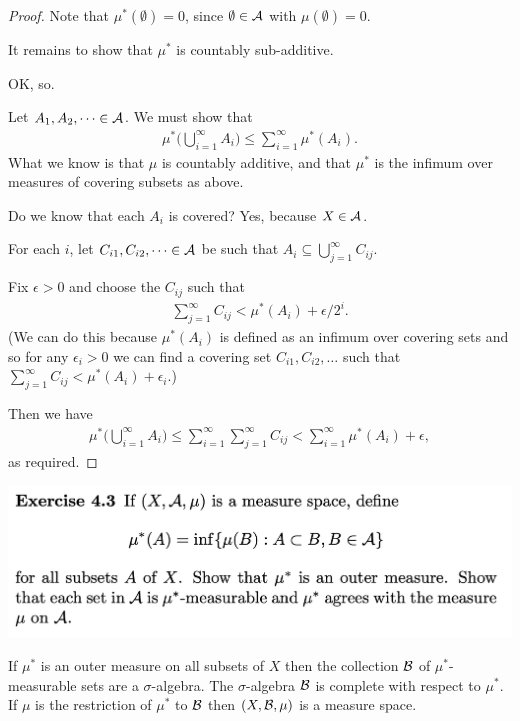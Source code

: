 \begin{proof}
  Note that $\mu^*(\emptyset) = 0$, since $\emptyset \in \mathcal A$ with $\mu(\emptyset) = 0$.

  It remains to show that $\mu^*$ is countably sub-additive.

  OK, so.

  Let $A_1, A_2, \dots \in \mathcal A$. We must show that
  \begin{align*}
    \mu^*\Big(\bigcup_{i=1}^\infty A_i\Big) \leq \sum_{i=1}^\infty \mu^*(A_i).
  \end{align*}
  What we know is that $\mu$ is countably additive, and that $\mu^*$ is the infimum over measures of covering
  subsets as above.

  Do we know that each $A_i$ is covered? Yes, because $X \in \mathcal A$.

  For each $i$, let $C_{i1}, C_{i2}, \dots \in \mathcal A$ be such that $A_i \subseteq \bigcup_{j=1}^\infty C_{ij}$.

  Fix $\epsilon > 0$ and choose the $C_{ij}$ such that
  \begin{align*}
    \sum_{j=1}^\infty C_{ij} < \mu^*(A_i) + \epsilon/2^i.
  \end{align*}
  (We can do this because $\mu^*(A_i)$ is defined as an infimum over covering sets and so for
  any $\epsilon_i > 0$ we can find a covering set $C_{i1}, C_{i2}, \dots$ such
  that $\sum_{j=1}^\infty C_{ij} < \mu^*(A_i) + \epsilon_i$.)

  Then we have
  \begin{align*}
    \mu^*\Big(\bigcup_{i=1}^\infty A_i\Big) \leq \sum_{i=1}^\infty \sum_{j=1}^\infty C_{ij} < \sum_{i=1}^\infty \mu^*(A_i) + \epsilon,
  \end{align*}
  as required.
\end{proof}
\includegraphics[width=400pt]{img/analysis--berkeley-202a-hw-0d98.png}

\begin{lemma}\label{carathéodory-theorem}
  If $\mu^*$ is an outer measure on all subsets of $X$ then the collection $\mathcal B$ of $\mu^*$-measurable sets
  are a $\sigma$-algebra. The $\sigma$-algebra $\mathcal B$ is complete with respect to $\mu^*$. If $\mu$ is the
  restriction of $\mu^*$ to $\mathcal B$ then $(X, \mathcal B, \mu)$ is a measure space.
\end{lemma}

